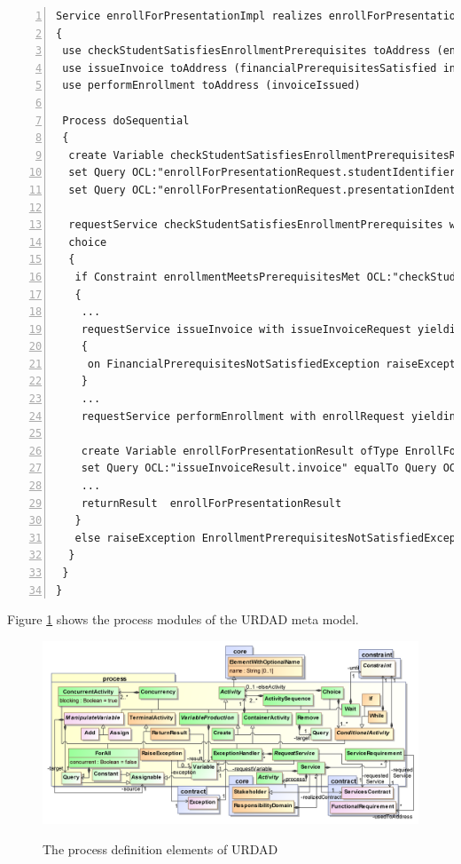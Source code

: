 \lstset{language=urdad,caption=Specifying a service in the textual URDAD DSL syntax.,label=serviceTextSyntax}
\begin{lstlisting}[numbers=left,escapechar=|]
Service enrollForPresentationImpl realizes enrollForPresentation receiving Variable enrollForPresentationRequest ofType EnrollForPresentationRequest
{
 use checkStudentSatisfiesEnrollmentPrerequisites toAddress (enrollmentPrerequisitesMet)
 use issueInvoice toAddress (financialPrerequisitesSatisfied invoiceIssued) 
 use performEnrollment toAddress (invoiceIssued)
   
 Process doSequential
 {
  create Variable checkStudentSatisfiesEnrollmentPrerequisitesRequest ofType CheckStudentSatisfiesEnrollmentPrerequisitesRequest               
  set Query OCL:"enrollForPresentationRequest.studentIdentifier" equalTo Query OCL:"checkEnrollmentPrerequisitesRequest.studentIdentifier"
  set Query OCL:"enrollForPresentationRequest.presentationIdentifier" equalTo Query OCL:"checkEnrollmentPrerequisitesRequest.presentationIdentifier"
                     
  requestService checkStudentSatisfiesEnrollmentPrerequisites with checkStudentSatisfiesEnrollmentPrerequisitesRequest yielding Variable checkStudentSatisfiesEnrollmentPrerequisitesResult ofType CheckStudentSatisfiesEnrollmentPrerequisitesResult
  choice
  {
   if Constraint enrollmentMeetsPrerequisitesMet OCL:"checkStudentSatisfiesEnrollmentPrerequisitesResult.enrollmentPrerequisitesMet = true" doSequential
   {
    ...
    requestService issueInvoice with issueInvoiceRequest yielding Variable issueInvoiceResult ofType IssueInvoiceResult
    {
     on FinancialPrerequisitesNotSatisfiedException raiseException FinancialPrerequisitesNotSatisfiedException
    }
    ...
    requestService performEnrollment with enrollRequest yielding Variable performEnrollmentResult ofType PerformEnrollmentResult
          
    create Variable enrollForPresentationResult ofType EnrollForPresentationResult
    set Query OCL:"issueInvoiceResult.invoice" equalTo Query OCL:"enrollForPresentationResult.invoice"
    ...                       
    returnResult  enrollForPresentationResult
   }
   else raiseException EnrollmentPrerequisitesNotSatisfiedException
  }
 }
}                 
\end{lstlisting}

Figure \ref{fig:processModule} shows the process modules of the URDAD meta model.
\begin{figure}[tb]
  \centering
  \includegraphics{process}\\   
  \caption{The process definition elements of URDAD}
  \label{fig:processModule}
\end{figure}
